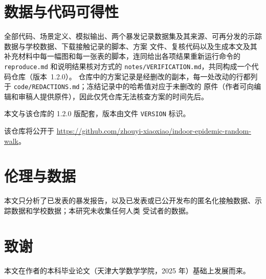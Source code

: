 \documentclass[UTF8,a4paper,11pt,fontset=fandol]{ctexart}
\newcommand{\repoversion}{1.2.0}
\newif\ifrepopublic
\newif\ifrepotagged
\begin{document}









\section*{数据与代码可得性}
全部代码、场景定义、模拟输出、两个暴发记录数据集及其来源、可再分发的示踪数据与学校数据、下载接触记录的脚本、方案
文件、复核代码以及生成本文及其补充材料中每一幅图和每一张表的脚本，连同给出各项结果重新运行命令的
\texttt{reproduce.md} 和说明结果核对方式的 \texttt{notes/VERIFICATION.md}，共同构成一个代码仓库（版本~\repoversion）。
仓库中的方案记录是经删改的副本，每一处改动的行都列于 \texttt{code/REDACTIONS.md}；冻结记录中的哈希值对应于未删改的
原件（作者可向编辑和审稿人提供原件），因此仅凭仓库无法核查方案的时间先后。
\ifrepopublic
该仓库公开于 \url{https://github.com/zhouyi-xiaoxiao/indoor-epidemic-random-walk}。
\ifrepotagged
本文对应标签 \texttt{v\repoversion}。
\else
本文与该仓库的 \repoversion{} 版配套，版本由文件 \texttt{VERSION} 标识。
\fi
\else
该仓库将公开于 \url{https://github.com/zhouyi-xiaoxiao/indoor-epidemic-random-walk}。
\fi

\section*{伦理与数据}
本文只分析了已发表的暴发报告，以及已发表或已公开发布的匿名化接触数据、示踪数据和学校数据；本研究未收集任何人类
受试者的数据。

\section*{致谢}
本文在作者的本科毕业论文（天津大学数学学院，2025 年）基础上发展而来。

{\small\setlength{\bibsep}{1pt plus 0.5pt}

}
\end{document}
